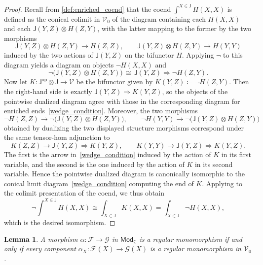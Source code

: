 \documentclass[11pt,onecolumn]{article}
\newcommand{\cV}{\mathscr{V}}
\newcommand{\cC}{\mathsf{C}}
\newcommand{\cJ}{\mathsf{J}}
\newcommand{\op}{\mathrm{op}}
\newcommand{\Mod}{\mathsf{Mod}}
\theoremstyle{plain}
\newtheorem{lem}[lem]{Lemma}
\theoremstyle{remark}
\theoremstyle{definition}
\begin{document}
\begin{proof}
	Recall from \cref{def:enriched_coend} that the coend $\int^{X \in \cJ} H(X,X)$ is defined as the conical colimit in $\cV_0$ of
	the diagram containing each $H(X,X)$ and each $\cJ(Y,Z)\otimes H(Z,Y)$, with the latter mapping to the former by the two morphisms
	\[
		\cJ(Y,Z)\otimes H(Z,Y) \longrightarrow H(Z,Z),
		\qquad
		\cJ(Y,Z)\otimes H(Z,Y) \longrightarrow H(Y,Y)
	\]
	induced by the two actions of $\cJ(Y,Z)$ on the bifunctor $H$.
	Applying $\neg$ to this diagram yields a diagram on objects $\neg H(X,X)$ and
	\[
		\neg\bigl(\cJ(Y,Z)\otimes H(Z,Y)\bigr)
		\,\cong\,
		\cJ(Y,Z)\Rightarrow \neg H(Z,Y).
	\]
	Now let $K \colon \cJ^\op \otimes \cJ \to \cV$ be the bifunctor given by $K(Y,Z) \coloneqq \neg H(Z,Y)$.
	Then the right-hand side is exactly $\cJ(Y,Z)\Rightarrow K(Y,Z)$, so the objects of the pointwise dualized diagram agree with those in
	the corresponding diagram for enriched ends~\eqref{wedge_condition}.
	Moreover, the two morphisms
	\[
		\neg H(Z,Z) \longrightarrow \neg\bigl(\cJ(Y,Z)\otimes H(Z,Y)\bigr),
		\qquad
		\neg H(Y,Y) \longrightarrow \neg\bigl(\cJ(Y,Z)\otimes H(Z,Y)\bigr)
	\]
	obtained by dualizing the two displayed structure morphisms correspond under the same tensor-hom adjunction to
	\[
		K(Z,Z) \longrightarrow \cJ(Y,Z)\Rightarrow K(Y,Z),
		\qquad
		K(Y,Y) \longrightarrow \cJ(Y,Z)\Rightarrow K(Y,Z).
	\]
	The first is the arrow in~\eqref{wedge_condition} induced by the action of $K$ in its first variable, and the second is the one induced by the action of $K$ in its second variable.
	Hence the pointwise dualized diagram is canonically isomorphic to the conical limit diagram~\eqref{wedge_condition} computing the end of $K$.
	Applying  to the colimit presentation of the coend, we thus obtain
	\[
		\neg \int^{X \in \cJ} H(X,X)
		\cong
		\int_{X \in \cJ} K(X,X)
		=
		\int_{X \in \cJ} \neg H(X,X),
	\]
	which is the desired isomorphism.
\end{proof}

\begin{lem}
	\label{lem:module_neg_monos}
	A morphism $\alpha \colon \mathcal{F} \to \mathcal{G}$ in $\Mod_\cC$ is a regular monomorphism if and only if every component $\alpha_X \colon \mathcal{F}(X) \to \mathcal{G}(X)$ is a regular monomorphism in $\cV_0$.
\end{lem}
\end{document}
